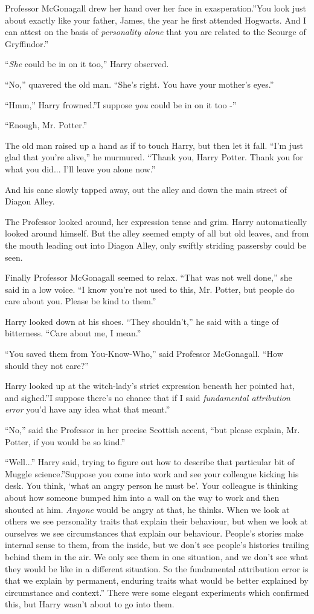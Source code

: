 Professor McGonagall drew her hand over her face in exasperation.''You
look just about exactly like your father, James, the year he first
attended Hogwarts. And I can attest on the basis of \emph{personality
alone} that you are related to the Scourge of Gryffindor.''

``\emph{She} could be in on it too,'' Harry observed.

``No,'' quavered the old man. ``She's right. You have your mother's
eyes.''

``Hmm,'' Harry frowned.''I suppose \emph{you} could be in on it too -''

``Enough, Mr. Potter.''

The old man raised up a hand as if to touch Harry, but then let it fall.
``I'm just glad that you're alive,'' he murmured. ``Thank you, Harry
Potter. Thank you for what you did... I'll leave you alone now.''

And his cane slowly tapped away, out the alley and down the main street
of Diagon Alley.

The Professor looked around, her expression tense and grim. Harry
automatically looked around himself. But the alley seemed empty of all
but old leaves, and from the mouth leading out into Diagon Alley, only
swiftly striding passersby could be seen.

Finally Professor McGonagall seemed to relax. ``That was not well
done,'' she said in a low voice. ``I know you're not used to this, Mr.
Potter, but people do care about you. Please be kind to them.''

Harry looked down at his shoes. ``They shouldn't,'' he said with a tinge
of bitterness. ``Care about me, I mean.''

``You saved them from You-Know-Who,'' said Professor McGonagall. ``How
should they not care?''

Harry looked up at the witch-lady's strict expression beneath her
pointed hat, and sighed.''I suppose there's no chance that if I said
\emph{fundamental attribution error} you'd have any idea what that
meant.''

``No,'' said the Professor in her precise Scottish accent, ``but please
explain, Mr. Potter, if you would be so kind.''

``Well...'' Harry said, trying to figure out how to describe that
particular bit of Muggle science.''Suppose you come into work and see
your colleague kicking his desk. You think, `what an angry person he
must be'. Your colleague is thinking about how someone bumped him into a
wall on the way to work and then shouted at him. \emph{Anyone} would be
angry at that, he thinks. When we look at others we see personality
traits that explain their behaviour, but when we look at ourselves we
see circumstances that explain our behaviour. People's stories make
internal sense to them, from the inside, but we don't see people's
histories trailing behind them in the air. We only see them in one
situation, and we don't see what they would be like in a different
situation. So the fundamental attribution error is that we explain by
permanent, enduring traits what would be better explained by
circumstance and context.'' There were some elegant experiments which
confirmed this, but Harry wasn't about to go into them.

